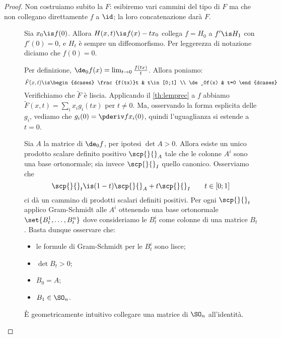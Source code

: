 \begin{proof}
	Non costruiamo subito la $F$:
	esibiremo vari cammini del tipo di $F$ ma che non collegano direttamente $f$ a $\id$;
	la loro concatenazione darà $F$.
	
	\newcommand*\ISOMOUSE[2]{\fbox{${#1}\dashrightarrow{#2}$}}
	\begin{description}
		\item[\ISOMOUSE{f}{f(0)=0}]
			Sia $x_0\is f(0)$.
			Allora $H(x,t)\is f(x)-tx_0$ collega $f=H_0$ a $f'\is H_1$ con $f'(0)=0$,
			e $H_t$ è sempre un diffeomorfismo.
			Per leggerezza di notazione diciamo che $f(0)=0$.
		\item[\ISOMOUSE{f}{\de_0f}]
			Per definizione, $\de_0f(x)=\lim_{t\to 0}\frac{f(tx)}t$.
			Allora poniamo:
			\[\tilde F(x,t)\is
			\begin{dcases}
				\frac{f(tx)}t & t\in[0;1] \\
				\de_0f(x) & t=0
			\end{dcases}\]
			Verifichiamo che $\tilde F$ è liscia.
			Applicando il \autoref{th:lemprec} a $f$ abbiamo $\tilde F(x,t)=\sum_ix_ig_i(tx)$ per $t\neq 0$.
			Ma, osservando la forma esplicita delle $g_i$,
			vediamo che $g_i(0)=\pderiv f{x_i}(0)$,
			quindi l'uguaglianza si estende a $t=0$.
		\item[\ISOMOUSE{\de_0f}{B_1\in\SO_n}]
			Sia $A$ la matrice di $\de_0f$,
			per ipotesi $\det A>0$.
			Allora esiste un unico prodotto scalare definito positivo $\scp{}{}_A$
			tale che le colonne $A^i$ sono una base ortonormale;
			sia invece $\scp{}{}_I$ quello canonico.
			Osserviamo che
			\[\scp{}{}_t\is (1-t)\scp{}{}_A+t\scp{}{}_I\qquad t\in[0;1]\]
			ci dà un cammino di prodotti scalari definiti positivi.
			Per ogni $\scp{}{}_t$ applico Gram-Schmidt alle $A^i$ ottenendo una base ortonormale
			$\set{B_t^1,\dots,B_t^n}$
			dove consideriamo le $B^i_t$ come colonne di una matrice $B_t$.
			Basta dunque osservare che:
			\begin{itemize}
				\item le formule di Gram-Schmidt per le $B^i_t$ sono lisce;
				\item $\det B_t>0$;
				\item $B_0=A$;
				\item $B_1\in\SO_n$.
			\end{itemize}
		\item[\ISOMOUSE{B_1}{\id}]
			È geometricamente intuitivo collegare una matrice di $\SO_n$ all'identità.
	\end{description}
	

\end{proof}
